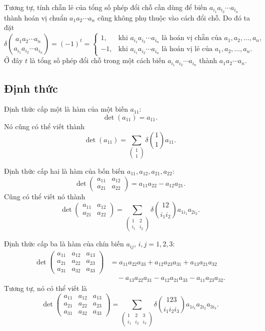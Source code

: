 \documentclass[11pt]{article}
\newcommand{\mat}[1]{\begin{pmatrix}#1\end{pmatrix}}
\begin{document}
Tương tự, tính chẵn lẻ của tổng số phép đổi chỗ cần dùng để biến
\(a_{i_1}a_{i_2}\cdots a_{i_n}\) thành hoán vị chuẩn
\(a_1a_2\cdots a_n\) cũng không phụ thuộc vào cách đổi chỗ. Do đó ta đặt
\[
  \delta\!\binom{a_1a_2\cdots a_n}{a_{i_1}a_{i_2}\cdots a_{i_n}}
  =(-1)^t
  =
  \begin{cases}
    1, & \text{khi } a_{i_1}a_{i_2}\cdots a_{i_n}
          \text{ là hoán vị chẵn của } a_1,a_2,\ldots,a_n,\\
   -1, & \text{khi } a_{i_1}a_{i_2}\cdots a_{i_n}
          \text{ là hoán vị lẻ của } a_1,a_2,\ldots,a_n.
  \end{cases}
\]
Ở đây \(t\) là tổng số phép đổi chỗ trong một cách biến
\(a_{i_1}a_{i_2}\cdots a_{i_n}\) thành \(a_1a_2\cdots a_n\).

\subsection{Định thức}

Định thức cấp một là hàm của một biến \(a_{11}\):
\[
  \det(a_{11})=a_{11}.
\]
Nó cũng có thể viết thành
\[
  \det(a_{11})=\sum_{\mat{1\\1}}
  \delta\!\binom{1}{1}a_{11}.
\]

Định thức cấp hai là hàm của bốn biến \(a_{11},a_{12},a_{21},a_{22}\):
\[
  \det\mat{a_{11} & a_{12}\\ a_{21} & a_{22}}
  =a_{11}a_{22}-a_{12}a_{21}.
\]
Cũng có thể viết nó thành
\[
  \det\mat{a_{11} & a_{12}\\ a_{21} & a_{22}}
  =
  \sum_{\mat{1&2\\ i_1&i_2}}
  \delta\!\binom{12}{i_1i_2}a_{1i_1}a_{2i_2}.
\]

Định thức cấp ba là hàm của chín biến \(a_{ij}\), \(i,j=1,2,3\):
\[
\begin{aligned}
  \det\mat{a_{11}&a_{12}&a_{13}\\
           a_{21}&a_{22}&a_{23}\\
           a_{31}&a_{32}&a_{33}}
  &=
  a_{11}a_{22}a_{33}+a_{12}a_{23}a_{31}+a_{13}a_{21}a_{32}\\
  &\quad
  -a_{13}a_{22}a_{31}-a_{12}a_{21}a_{33}-a_{11}a_{23}a_{32}.
\end{aligned}
\]
Tương tự, nó có thể viết là
\[
  \det\mat{a_{11}&a_{12}&a_{13}\\
           a_{21}&a_{22}&a_{23}\\
           a_{31}&a_{32}&a_{33}}
  =
  \sum_{\mat{1&2&3\\ i_1&i_2&i_3}}
  \delta\!\binom{123}{i_1i_2i_3}
  a_{1i_1}a_{2i_2}a_{3i_3}.
\]
\end{document}
